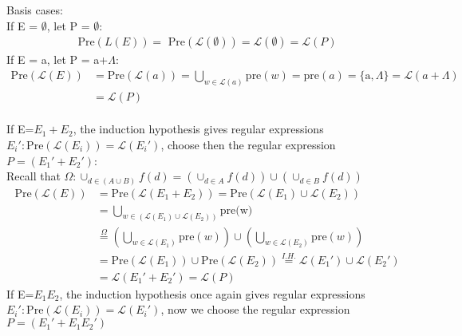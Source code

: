 \documentclass{article}
\theoremstyle{remark}
\numberwithin{equation}{section}
\begin{document}
	\noindent Basis cases:\\
	If E = $\emptyset$, let P = $\emptyset$:
	\begin{align*}
	\text{Pre}(L(E))=\text{ Pre}(\mathcal{L(\emptyset)}) =\mathcal{L}(\emptyset)=\mathcal{L}(P)
	\end{align*}
	If E = a, let P = a+$\Lambda$:
	\begin{align*}
	\text{Pre}(\mathcal{L}(E))&=\text{Pre}(\mathcal{L}(a)) = \bigcup_{w\in\mathcal{L}(a)}\text{pre}(w) = \text{pre}(a)= \{ \text{a}, \Lambda \} = \mathcal{L}(a + \Lambda)
	\\&=\mathcal{L}(P)
	\end{align*}
	\\
	If E=$E_1+E_2$, the induction hypothesis gives regular expressions $E_i':\text{Pre}(\mathcal{L}(E_i))=\mathcal{L}(E_i')$, choose then the regular expression $P=(E_1'+E_2')$:
	\\Recall that $\Omega: \cup_{d \in (A\cup B)}f(d) = (\cup_{d\in A}f(d)) \cup (\cup_{d\in B}f(d))$
	\begin{align*}
	\text{Pre}(\mathcal{L}(E)) &= \text{Pre} (\mathcal{L}(E_{1} + E_{2}) ) = \text{Pre} 
	(\mathcal{L}(E_{1}) \cup \mathcal{L}(E_{2})) \\
	&= \bigcup_{w\in (\mathcal{L}(E_{1}) \cup \mathcal{L}(E_{2}))} \text{pre(w)}
	\\&\stackrel{\Omega}{=} \left( \bigcup_{w\in \mathcal{L}(E_1)} \text{pre}(w) \right) \cup \left( \bigcup_{w\in \mathcal{L}(E_2)} \text{pre}(w) \right)\\
	&= \text{Pre}(\mathcal{L}(E_{1}))\cup \text{Pre}(\mathcal{L}(E_{2}))\stackrel{I.H.}{=} \mathcal{L}(E_{1}')\cup \mathcal{L}(E_{2}') \\ &= \mathcal{L}(E_1'+E_2') = \mathcal{L}(P)
	\end{align*}
	If E=$E_{1}E_{2}$, the induction hypothesis once again gives regular expressions $E_i':\text{Pre}(\mathcal{L}(E_i))=\mathcal{L}(E_i')$, now we choose the regular expression $P=(E_1'+E_1E_2')$
\end{document}
